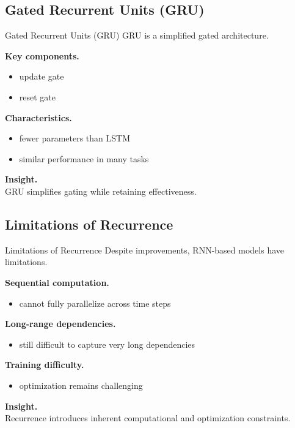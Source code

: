 \documentclass[aspectratio=169,11pt]{beamer}
\begin{document}
\subsection{Gated Recurrent Units (GRU)}
\begin{frame}[t,allowframebreaks]{Gated Recurrent Units (GRU)}
\small
GRU is a simplified gated architecture.

\textbf{Key components.}\\ \begin{itemize}
    \item update gate
    \item reset gate
\end{itemize}

\textbf{Characteristics.}\\ \begin{itemize}
    \item fewer parameters than LSTM
    \item similar performance in many tasks
\end{itemize}

\textbf{Insight.}\\ GRU simplifies gating while retaining effectiveness.
\end{frame}

\subsection{Limitations of Recurrence}
\begin{frame}[t,allowframebreaks]{Limitations of Recurrence}
\small
Despite improvements, RNN-based models have limitations.

\textbf{Sequential computation.}\\ \begin{itemize}
    \item cannot fully parallelize across time steps
\end{itemize}

\textbf{Long-range dependencies.}\\ \begin{itemize}
    \item still difficult to capture very long dependencies
\end{itemize}

\textbf{Training difficulty.}\\ \begin{itemize}
    \item optimization remains challenging
\end{itemize}

\textbf{Insight.}\\ Recurrence introduces inherent computational and optimization constraints.
\end{frame}
\end{document}
